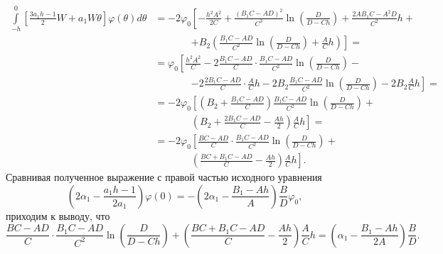 \documentclass[a4paper,14pt]{article}
\begin{document}
\begin{equation*}
  \begin{aligned}
    \int\limits_{-h}^{0}
    \left[
    \frac{3 a_1 h - 1}{2}
    W
    +
    a_1 W \theta
    \right] \varphi(\theta) d\theta
    &=
      -2 \varphi_0
      \left[
      -
      \frac{h^2 A^2}{2 C}
      +
      \frac{{(B_1 C - A D)}^2}{C^3}
      \ln \left( \frac{D}{D - C h} \right)
      +
      \frac{2 A B_1 C - A^2 D}{C^2} h
      \right. + \\
    &\phantom{= -2 \varphi_0}
      \left.
      + B_2 \left(
      \frac{B_1 C - A D}{C^2}
      \ln \left( \frac{D}{D - C h} \right)
      +
      \frac{A}{C} h
      \right)
      \right] = \\
    &=
      \varphi_0
      \left[
      \frac{h^2 A^2}{C}
      - 2
      \frac{B_1 C - A D}{C} \cdot
      \frac{B_1 C - A D}{C^2}
      \ln \left( \frac{D}{D - C h} \right)
      \right. - \\
    &\phantom{= -2 \varphi_0}
      \left.
      - 2 \frac{2 B_1 C - A D}{C} \cdot \frac{A}{C} h
      - 2 B_2
      \frac{B_1 C - A D}{C^2}
      \ln \left( \frac{D}{D - C h} \right)
      -2 B_2
      \frac{A}{C} h
      \right] = \\
    &=
      - 2
      \varphi_0
      \left[
      \left(
      B_2 + \frac{B_1 C - A D}{C}
      \right)
      \frac{B_1 C - A D}{C^2}
      \ln \left( \frac{D}{D - C h} \right)
      \right. + \\
    &\phantom{= -2 \varphi_0}
      \left.
      \left( B_2 + \frac{2 B_1 C - A D}{C} - \frac{A h }{2} \right)
      \frac{A}{C} h
      \right] = \\
    &=
      - 2
      \varphi_0
      \left[
      \frac{B C - A D}{C} \cdot
      \frac{B_1 C - A D}{C^2}
      \ln \left( \frac{D}{D - C h} \right)
      \right. + \\
    &\phantom{= -2 \varphi_0}
      \left.
      \left( \frac{B C + B_1 C - A D}{C} - \frac{A h }{2} \right)
      \frac{A}{C} h
      \right].
  \end{aligned}
\end{equation*}
Сравнивая полученное выражение с правой частью исходного уравнения
\begin{equation*}
  \left(
    2 \alpha_1
    -
    \frac{a_1 h - 1}{2 a_1}
  \right)
  \varphi(0)
  =
  -
  \left(
    2 \alpha_1
    -
    \frac{B_1 - A h}{A}
  \right)
  \frac{B}{D} \varphi_0,
\end{equation*}
приходим к выводу, что
\begin{equation*}
  \frac{B C - A D}{C} \cdot
  \frac{B_1 C - A D}{C^2}
  \ln \left( \frac{D}{D - C h} \right)
  +
  \left( \frac{B C + B_1 C - A D}{C} - \frac{A h }{2} \right)
  \frac{A}{C} h
  =
  \left(
    \alpha_1
    -
    \frac{B_1 - A h}{2 A}
  \right)
  \frac{B}{D}.
\end{equation*}
\end{document}
